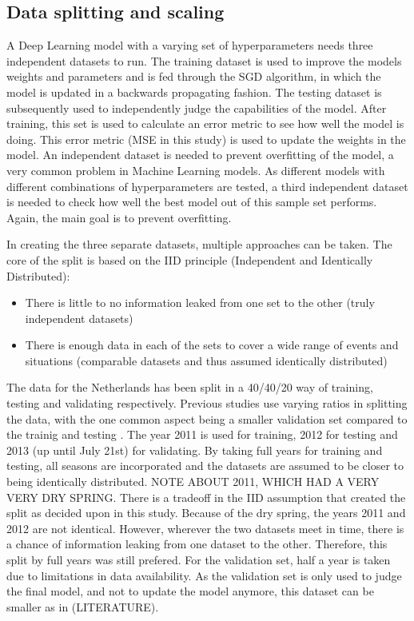 \documentclass[twocolumn, 10pt, a4paper]{memoir}
\begin{document}
		\subsection{Data splitting and scaling}
		A Deep Learning model with a varying set of hyperparameters needs three independent datasets to run. The training dataset is used to improve the models weights and parameters and is fed through the SGD algorithm, in which the model is updated in a backwards propagating fashion. The testing dataset is subsequently used to independently judge the capabilities of the model. After training, this set is used to calculate an error metric to see how well the model is doing. This error metric (MSE in this study) is used to update the weights in the model. An independent dataset is needed to prevent overfitting of the model, a very common problem in Machine Learning models. 
		As different models with different combinations of hyperparameters are tested, a third independent dataset is needed to check how well the best model out of this sample set performs. Again, the main goal is to prevent overfitting. 
		
		In creating the three separate datasets, multiple approaches can be taken. The core of the split is based on the IID principle (Independent and Identically Distributed):
		
		\begin{itemize}
			\item There is little to no information leaked from one set to the other (truly independent datasets)
			\item There is enough data in each of the sets to cover a wide range of events and situations (comparable datasets and thus assumed identically distributed)
		\end{itemize}
		The data for the Netherlands has been split in a 40/40/20 way of training, testing and validating respectively. Previous studies use varying ratios in splitting the data, with the one common aspect being a smaller validation set compared to the trainig and testing \cite{Polz2020,Diba2021,Pudashine2020}.
		The year 2011 is used for training, 2012 for testing and 2013 (up until July 21st) for validating. By taking full years for training and testing, all seasons are incorporated and the datasets are assumed to be closer to being identically distributed. NOTE ABOUT 2011, WHICH HAD A VERY VERY DRY SPRING.
		There is a tradeoff in the IID assumption that created the split as decided upon in this study. Because of the dry spring, the years 2011 and 2012 are not identical. However, wherever the two datasets meet in time, there is a chance of information leaking from one dataset to the other. Therefore, this split by full years was still prefered. For the validation set, half a year is taken due to limitations in data availability. As the validation set is only used to judge the final model, and not to update the model anymore, this dataset can be smaller as in (LITERATURE). 
		
\end{document}
